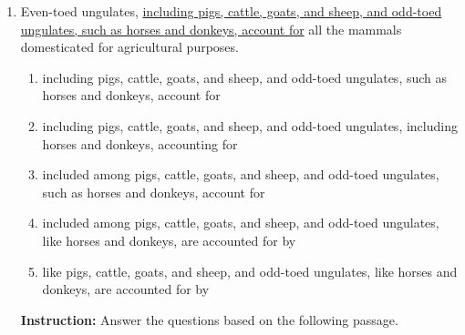 \documentclass[12pt]{article}
\begin{document}
\begin{enumerate}[label=\textbf{\arabic*.}]
\begin{enumerate}[label=(\Alph*),itemsep=8pt]
\end{enumerate}

\item Even-toed ungulates, \underline{including pigs, cattle, goats, and sheep, and odd-toed ungulates, such as horses } \underline{ and donkeys, account for} all the mammals domesticated for agricultural purposes.

\begin{enumerate}[label=(\Alph*),itemsep=8pt]

\item including pigs, cattle, goats, and sheep, and odd-toed ungulates, such as horses and donkeys, account for

\item including pigs, cattle, goats, and sheep, and odd-toed ungulates, including horses and donkeys, accounting for

\item included among pigs, cattle, goats, and sheep, and odd-toed ungulates, such as horses and donkeys, account for

\item included among pigs, cattle, goats, and sheep, and odd-toed ungulates, like horses and donkeys, are accounted for by

\item like pigs, cattle, goats, and sheep, and odd-toed ungulates, like horses and donkeys, are accounted for by

\end{enumerate}

\noindent\textbf{Instruction:} Answer the questions based on the following passage.


\end{enumerate}
\end{document}
